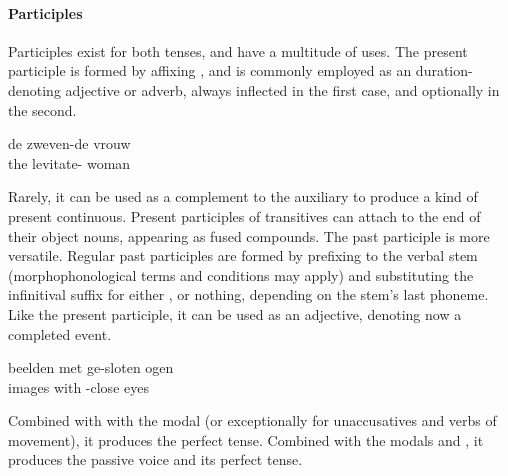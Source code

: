\paragraph{Participles}
Participles exist for both tenses, and have a multitude of uses.
The present participle is formed by affixing , and is commonly employed as an duration-denoting adjective or adverb, always inflected in the first case, and optionally in the second.
\begin{exe}
\ex
\gll de zweven-de vrouw\\
the levitate- woman\\
\end{exe}
Rarely, it can be used as a complement to the auxiliary  to produce a kind of present continuous.
Present participles of transitives can attach to the end of their object nouns, appearing as fused compounds.
The past participle is more versatile.
Regular past participles are formed by prefixing  to the verbal stem (morphophonological terms and conditions may apply) and substituting the infinitival suffix for either ,  or nothing, depending on the stem's last phoneme.
Like the present participle, it can be used as an adjective, denoting now a completed event.
\begin{exe}
\ex
\gll beelden met ge-sloten ogen\\
images with -close eyes\\
\end{exe}
Combined with with the modal  (or exceptionally  for unaccusatives and verbs of movement), it produces the perfect tense.
Combined with the modals  and , it produces the passive voice and its perfect tense.

